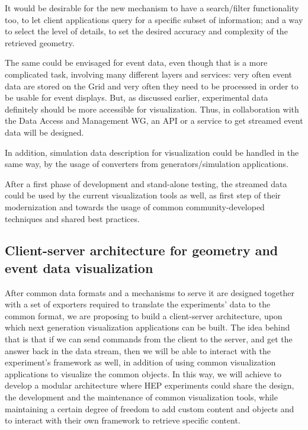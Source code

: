 \documentclass[12pt,a4paper]{article}
\begin{document}
It would be desirable for the new mechanism to have a search/filter functionality too, to let client applications query
for a specific subset of information; and a way to select the level of details, to set the desired accuracy and complexity
of the retrieved geometry.

The same could be envisaged for event data, even though that is a more complicated task, involving many different layers and services:
very often event data are stored on the Grid and very often they need to be processed in order to be usable for event displays.
But, as discussed earlier, experimental data definitely should be more accessible for visualization. Thus, in collaboration with
the Data Access and Management WG, an API or a service to get streamed event data will be designed.

In addition, simulation data description for visualization could be handled in the same way, by the usage of converters from
generators/simulation applications.

After a first phase of development and stand-alone testing, the streamed data could be used by the current visualization tools
as well, as first step of their modernization and towards the usage of common community-developed techniques and shared best practices.

\hypertarget{client-server}{%
\subsection{Client-server architecture for geometry and event data visualization}\label{client-server}}

After common data formats and a mechanisms to serve it are designed together with a set of exporters required to translate the
experiments’ data to the common format, we are proposing to build a client-server architecture, upon which next generation visualization applications can be built.
The idea behind that is that if we can send commands from the client to the server, and get the answer back in the data stream,
then we will be able to interact with the experiment’s framework as well, in addition of using common visualization applications
to visualize the common objects. In this way, we will achieve to develop a modular architecture where HEP experiments could share
the design, the development and the maintenance of common visualization tools, while maintaining a certain degree of freedom to
add custom content and objects and to interact with their own framework to retrieve specific content.
\end{document}
